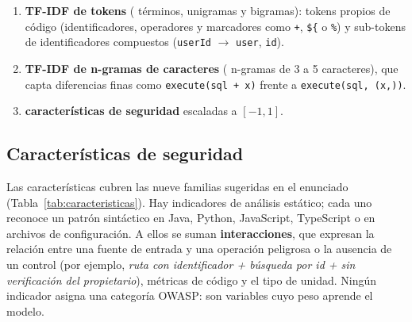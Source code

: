 \documentclass[12pt,a4paper]{article}
\newcommand{\cod}[1]{\texttt{#1}}
\begin{document}
\begin{enumerate}
  \item \textbf{TF-IDF de tokens} (\dimTokens{} términos, unigramas y bigramas): tokens propios de código (identificadores, operadores y marcadores como \cod{+}, \cod{\$\{} o \cod{\%}) y sub-tokens de identificadores compuestos (\cod{userId} \(\rightarrow\) \cod{user}, \cod{id}).
  \item \textbf{TF-IDF de n-gramas de caracteres} (\dimCaracteres{} n-gramas de 3 a 5 caracteres), que capta diferencias finas como \cod{execute(sql + x)} frente a \cod{execute(sql, (x,))}.
  \item \textbf{\nCaracteristicas{} características de seguridad} escaladas a \([-1, 1]\).
\end{enumerate}

\subsection{Características de seguridad}
Las características cubren las nueve familias sugeridas en el enunciado (Tabla~\ref{tab:caracteristicas}). Hay \nIndicadores{} indicadores de análisis estático; cada uno reconoce un patrón sintáctico en Java, Python, JavaScript, TypeScript o en archivos de configuración. A ellos se suman \nDerivadas{} \textbf{interacciones}, que expresan la relación entre una fuente de entrada y una operación peligrosa o la ausencia de un control (por ejemplo, \emph{ruta con identificador + búsqueda por id + sin verificación del propietario}), métricas de código y el tipo de unidad. Ningún indicador asigna una categoría OWASP: son variables cuyo peso aprende el modelo.
\end{document}
